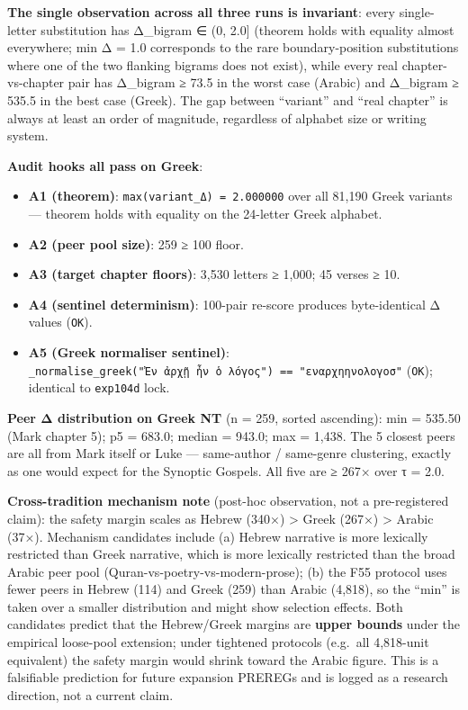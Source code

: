 \documentclass[
]{article}
\providecommand{\tightlist}{%
  \setlength{\itemsep}{0pt}\setlength{\parskip}{0pt}}
\begin{document}
\textbf{The single observation across all three runs is invariant}:
every single-letter substitution has Δ\_bigram ∈ (0, 2.0{]} (theorem
holds with equality almost everywhere; min Δ = 1.0 corresponds to the
rare boundary-position substitutions where one of the two flanking
bigrams does not exist), while every real chapter-vs-chapter pair has
Δ\_bigram ≥ 73.5 in the worst case (Arabic) and Δ\_bigram ≥ 535.5 in the
best case (Greek). The gap between ``variant'' and ``real chapter'' is
always at least an order of magnitude, regardless of alphabet size or
writing system.

\textbf{Audit hooks all pass on Greek}:

\begin{itemize}
\tightlist
\item
  \textbf{A1 (theorem)}: \texttt{max(variant\_Δ)\ =\ 2.000000} over all
  81,190 Greek variants --- theorem holds with equality on the 24-letter
  Greek alphabet.
\item
  \textbf{A2 (peer pool size)}: 259 ≥ 100 floor.
\item
  \textbf{A3 (target chapter floors)}: 3,530 letters ≥ 1,000; 45 verses
  ≥ 10.
\item
  \textbf{A4 (sentinel determinism)}: 100-pair re-score produces
  byte-identical Δ values (\texttt{OK}).
\item
  \textbf{A5 (Greek normaliser sentinel)}:
  \texttt{\_normalise\_greek("Ἐν\ ἀρχῇ\ ἦν\ ὁ\ λόγος")\ ==\ "εναρχηηνολογοσ"}
  (\texttt{OK}); identical to \texttt{exp104d} lock.
\end{itemize}

\textbf{Peer Δ distribution on Greek NT} (n = 259, sorted ascending):
min = 535.50 (Mark chapter 5); p5 = 683.0; median = 943.0; max = 1,438.
The 5 closest peers are all from Mark itself or Luke --- same-author /
same-genre clustering, exactly as one would expect for the Synoptic
Gospels. All five are ≥ 267× over τ = 2.0.

\textbf{Cross-tradition mechanism note} (post-hoc observation, not a
pre-registered claim): the safety margin scales as Hebrew (340×)
\textgreater{} Greek (267×) \textgreater{} Arabic (37×). Mechanism
candidates include (a) Hebrew narrative is more lexically restricted
than Greek narrative, which is more lexically restricted than the broad
Arabic peer pool (Quran-vs-poetry-vs-modern-prose); (b) the F55 protocol
uses fewer peers in Hebrew (114) and Greek (259) than Arabic (4,818), so
the ``min'' is taken over a smaller distribution and might show
selection effects. Both candidates predict that the Hebrew/Greek margins
are \textbf{upper bounds} under the empirical loose-pool extension;
under tightened protocols (e.g.~all 4,818-unit equivalent) the safety
margin would shrink toward the Arabic figure. This is a falsifiable
prediction for future expansion PREREGs and is logged as a research
direction, not a current claim.
\end{document}
